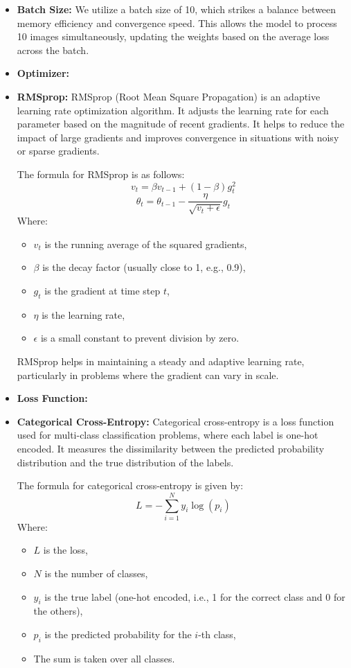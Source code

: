 \documentclass{article}
\begin{document}
\begin{itemize}
    \item \textbf{Batch Size:} We utilize a batch size of 10, which strikes a balance between memory efficiency and convergence speed. This allows the model to process 10 images simultaneously, updating the weights based on the average loss across the batch.
    \item \textbf{Optimizer:} \item \textbf{RMSprop:} RMSprop (Root Mean Square Propagation) is an adaptive learning rate optimization algorithm. It adjusts the learning rate for each parameter based on the magnitude of recent gradients. It helps to reduce the impact of large gradients and improves convergence in situations with noisy or sparse gradients.

The formula for RMSprop is as follows:
\[
v_t = \beta v_{t-1} + (1 - \beta) g_t^2
\]
\[
\theta_t = \theta_{t-1} - \frac{\eta}{\sqrt{v_t + \epsilon}} g_t
\]
Where:
\begin{itemize}
    \item \( v_t \) is the running average of the squared gradients,
    \item \( \beta \) is the decay factor (usually close to 1, e.g., 0.9),
    \item \( g_t \) is the gradient at time step \( t \),
    \item \( \eta \) is the learning rate,
    \item \( \epsilon \) is a small constant to prevent division by zero.
\end{itemize}
RMSprop helps in maintaining a steady and adaptive learning rate, particularly in problems where the gradient can vary in scale.

  \item \textbf{Loss Function:}\item \textbf{Categorical Cross-Entropy:} Categorical cross-entropy is a loss function used for multi-class classification problems, where each label is one-hot encoded. It measures the dissimilarity between the predicted probability distribution and the true distribution of the labels.

The formula for categorical cross-entropy is given by:
\[
L = - \sum_{i=1}^{N} y_i \log(p_i)
\]
Where:
\begin{itemize}
    \item \( L \) is the loss,
    \item \( N \) is the number of classes,
    \item \( y_i \) is the true label (one-hot encoded, i.e., 1 for the correct class and 0 for the others),
    \item \( p_i \) is the predicted probability for the \( i \)-th class,
    \item The sum is taken over all classes.
\end{itemize}


\end{itemize}
\end{document}

